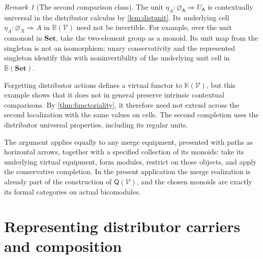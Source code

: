 \documentclass[11pt,reqno]{amsart}
\theoremstyle{plain}
\theoremstyle{definition}
\theoremstyle{remark}
\newtheorem{remark}[theorem]{Remark}
\numberwithin{equation}{section}
\newcommand{\V}{\mathcal V}
\newcommand{\Q}{\mathsf Q}
\newcommand{\Kcal}{\mathbb K}
\newcommand{\cell}{\mathrel{\Longrightarrow}}
\newcommand{\emp}[1]{\varnothing_{#1}}
\newcommand{\Set}{\mathbf{Set}}
\begin{document}
\begin{remark}[The second comparison class]\label{rem:secondcomparison}
The unit $\eta_A:\emp{\mathsf A}\cell U_{\mathsf A}$ is
contextually universal in the distributor calculus by
\cref{lem:distunit}. Its underlying cell
$\eta_A:\emp X\cell A$ in $\mathbb B(\V)$ need not be
invertible. For example, over the unit comonoid in $\Set$, take the
two-element group as a monoid. Its unit map from the singleton is not
an isomorphism; unary conservativity and the represented singleton
identify this with noninvertibility of the underlying unit cell in
$\mathbb B(\Set)$.

Forgetting distributor actions defines a virtual functor to
$\Kcal(\V)$, but this example shows that it does not in general
preserve intrinsic contextual comparisons. By
\cref{thm:functoriality}, it therefore need not extend across the
second localization with the same values on cells. The second completion
uses the distributor universal properties, including its regular units.
\end{remark}

The argument applies equally to any merge equipment, presented with paths
as horizontal arrows, together with a specified collection of its monoids:
take its underlying virtual equipment, form modules, restrict on those
objects, and apply the conservative completion. In the present application
the merge realization is already part of the construction of $\Q(\V)$,
and the chosen monoids are exactly its formal categories on actual
bicomodules.

\section{Representing distributor carriers and composition}\label{sec:distributorrecovery}
\end{document}

